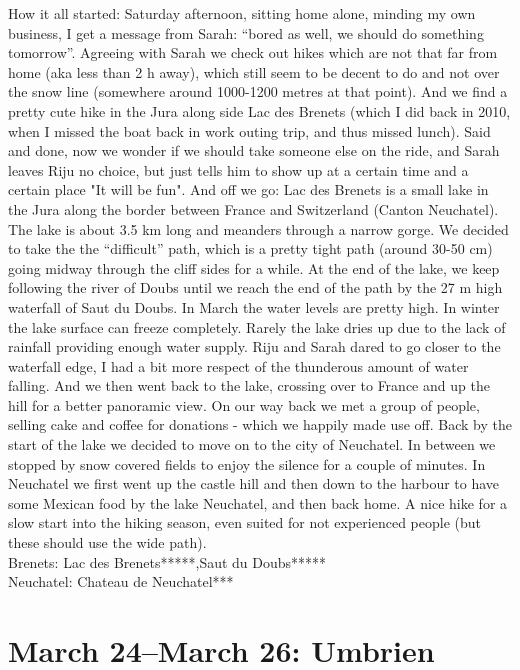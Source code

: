 How it all started: Saturday afternoon, sitting home alone, minding my own business, I get a message from Sarah: ``bored as well, we should do something tomorrow''. Agreeing with Sarah we check out hikes which are not that far from home (aka less than 2 h away), which still seem to be decent to do and not over the snow line (somewhere around 1000-1200 metres at that point). And we find a pretty cute hike in the Jura along side Lac des Brenets (which I did back in 2010, when I missed the boat back in work outing trip, and thus missed lunch). Said and done, now we wonder if we should take someone else on the ride, and Sarah leaves Riju no choice, but just tells him to show up at a certain time and a certain place "It will be fun". And off we go: Lac des Brenets is a small lake in the Jura along the border between France and Switzerland (Canton Neuchatel). The lake is about 3.5 km long and meanders through a narrow gorge. We decided to take the the ``difficult'' path, which is a pretty tight path (around 30-50 cm) going midway through the cliff sides for a while. At the end of the lake, we keep following the river of Doubs until we reach the end of the path by the 27 m high waterfall of Saut du Doubs. In March the water levels are pretty high. In winter the lake surface can freeze completely. Rarely the lake dries up due to the lack of rainfall providing enough water supply. Riju and Sarah dared to go closer to the waterfall edge, I had a bit more respect of the thunderous amount of water falling. And we then went back to the lake, crossing over to France and up the hill for a better panoramic view. On our way back we met a group of people, selling cake and coffee for donations - which we happily made use off. Back by the start of the lake we decided to move on to the city of Neuchatel. In between we stopped by snow covered fields to enjoy the silence for a couple of minutes. In Neuchatel we first went up the castle hill and then down to the harbour to have some Mexican food by the lake Neuchatel, and then back home. A nice hike for a slow start into the hiking season, even suited for not experienced people (but these should use the wide path).\\

Brenets: Lac des Brenets*****,Saut du Doubs*****\\
Neuchatel: Chateau de Neuchatel***\\

\section{March 24--March 26: Umbrien}
\label{2017:Umbria}

